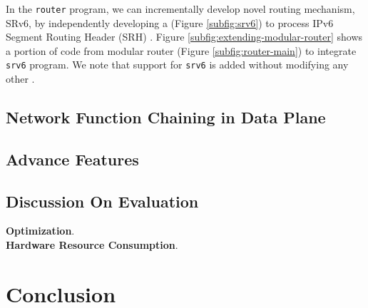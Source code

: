 \documentclass[letterpaper,twocolumn,10pt]{article}
\begin{document}
In the \texttt{router} program, we can incrementally develop novel routing mechanism, SRv6, by 
independently developing a \uprogram (Figure \ref{subfig:srv6}) to process IPv6 Segment Routing Header (SRH) \cite{srh}.
Figure \ref{subfig:extending-modular-router} shows a portion of code from modular router (Figure \ref{subfig:router-main}) to integrate \texttt{srv6} program.
We note that support for \texttt{srv6} is added without modifying any other \uprogram.


\subsection{Network Function Chaining in Data Plane}

\subsection{Advance Features}

\subsection{Discussion On Evaluation}
\textbf{Optimization}. \\
\textbf{Hardware Resource Consumption}. \\

\section{Conclusion}




\clearpage




\appendix
\end{document}
